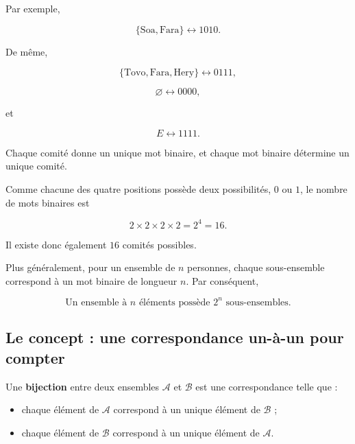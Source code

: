 Par exemple,

\[
\{\text{Soa},\text{Fara}\}
\longleftrightarrow
1010.
\]

\begin{center}
\end{center}

De même,

\[
\{\text{Tovo},\text{Fara},\text{Hery}\}
\longleftrightarrow
0111,
\]

\[
\varnothing
\longleftrightarrow
0000,
\]

et

\[
E
\longleftrightarrow
1111.
\]

Chaque comité donne un unique mot binaire, et chaque mot binaire détermine
un unique comité.

Comme chacune des quatre positions possède deux possibilités, \(0\) ou \(1\),
le nombre de mots binaires est

\[
2\times2\times2\times2=2^4=16.
\]

Il existe donc également \(16\) comités possibles.

Plus généralement, pour un ensemble de \(n\) personnes, chaque sous-ensemble
correspond à un mot binaire de longueur \(n\). Par conséquent,

\[
\boxed{
\text{Un ensemble à \(n\) éléments possède \(2^n\) sous-ensembles.}
}
\]

\subsection{Le concept : une correspondance un-à-un pour compter}

Une \textbf{bijection} entre deux ensembles \(\mathcal A\) et \(\mathcal B\)
est une correspondance telle que :

\begin{itemize}
    \item chaque élément de \(\mathcal A\) correspond à un unique élément de
    \(\mathcal B\) ;
    \item chaque élément de \(\mathcal B\) correspond à un unique élément de
    \(\mathcal A\).
\end{itemize}

